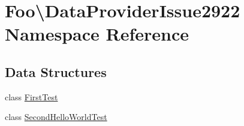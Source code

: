 \hypertarget{namespace_foo_1_1_data_provider_issue2922}{}\section{Foo\textbackslash{}Data\+Provider\+Issue2922 Namespace Reference}
\label{namespace_foo_1_1_data_provider_issue2922}
\subsection*{Data Structures}
\begin{DoxyCompactItemize}
\item 
class \mbox{\hyperlink{class_foo_1_1_data_provider_issue2922_1_1_first_test}{First\+Test}}
\item 
class \mbox{\hyperlink{class_foo_1_1_data_provider_issue2922_1_1_second_hello_world_test}{Second\+Hello\+World\+Test}}
\end{DoxyCompactItemize}
